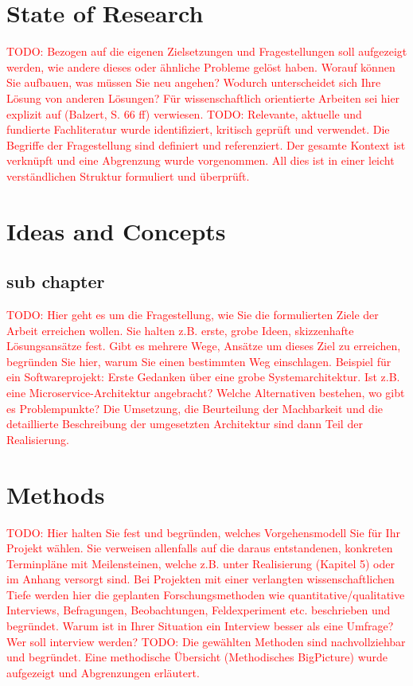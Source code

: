 \documentclass[a4paper,12pt,listof=numbered,toc=chapterentrywithdots]{scrreport}
\renewcommand{\todo}[1]{\textcolor{red}{TODO: #1}}
\begin{document}
	
	\chapter{State of Research}
		\todo{Bezogen auf die eigenen Zielsetzungen und Fragestellungen soll aufgezeigt werden, wie andere dieses oder ähnliche Probleme gelöst haben. Worauf können Sie aufbauen, was müssen Sie neu angehen?	Wodurch unterscheidet sich Ihre Lösung von anderen Lösungen? Für wissenschaftlich orientierte Arbeiten sei hier explizit auf (Balzert, S. 66 ff) verwiesen.}
		\todo{Relevante, aktuelle und fundierte Fachliteratur wurde identifiziert, kritisch geprüft und verwendet. Die Begriffe der Fragestellung sind definiert und referenziert. Der gesamte Kontext ist verknüpft und eine Abgrenzung wurde vorgenommen. All dies ist in einer leicht verständlichen Struktur formuliert und überprüft.}
	
	\chapter{Ideas and Concepts}
	\section{sub chapter}
		\todo{Hier geht es um die Fragestellung, wie Sie die formulierten Ziele der Arbeit erreichen wollen. Sie halten z.B. erste, grobe Ideen, skizzenhafte Lösungsansätze fest. Gibt es mehrere Wege, Ansätze um dieses Ziel zu erreichen, begründen Sie hier, warum Sie einen bestimmten Weg einschlagen. Beispiel für ein Softwareprojekt: Erste Gedanken über eine grobe Systemarchitektur. Ist z.B. eine Microservice-Architektur angebracht? Welche Alternativen bestehen, wo gibt es Problempunkte? Die Umsetzung, die Beurteilung der Machbarkeit und die detaillierte Beschreibung der umgesetzten Architektur sind dann Teil der Realisierung.}
	
	\chapter{Methods}
		\todo{Hier halten Sie fest und begründen, welches Vorgehensmodell Sie für Ihr Projekt wählen. Sie verweisen allenfalls auf die daraus entstandenen, konkreten Terminpläne mit Meilensteinen, welche z.B. unter Realisierung (Kapitel 5) oder im Anhang versorgt sind. Bei Projekten mit einer verlangten wissenschaftlichen Tiefe werden hier die geplanten Forschungsmethoden wie quantitative/qualitative Interviews, Befragungen, Beobachtungen, Feldexperiment etc. beschrieben und begründet. Warum ist in Ihrer Situation ein Interview besser als eine Umfrage? Wer soll interview werden?}
		\todo{Die gewählten Methoden sind nachvollziehbar und begründet. Eine methodische Übersicht (Methodisches BigPicture) wurde aufgezeigt und Abgrenzungen erläutert.}
	
\end{document}
